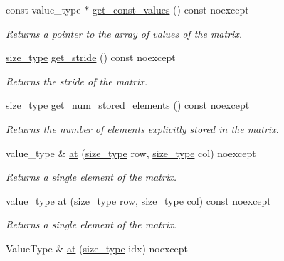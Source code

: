 \begin{DoxyCompactItemize}
const value\+\_\+type $\ast$ \hyperlink{classgko_1_1matrix_1_1Dense_ab83c739c1b11abaecc3bfd89506f6c9c}{get\+\_\+const\+\_\+values} () const noexcept
\begin{DoxyCompactList}\small\item\em Returns a pointer to the array of values of the matrix. \end{DoxyCompactList}\item 
\hyperlink{namespacegko_a6e5c95df0ae4e47aab2f604a22d98ee7}{size\+\_\+type} \hyperlink{classgko_1_1matrix_1_1Dense_a8c1b220b9b9292893d9be22d632a9a0e}{get\+\_\+stride} () const noexcept
\begin{DoxyCompactList}\small\item\em Returns the stride of the matrix. \end{DoxyCompactList}\item 
\hyperlink{namespacegko_a6e5c95df0ae4e47aab2f604a22d98ee7}{size\+\_\+type} \hyperlink{classgko_1_1matrix_1_1Dense_a7a6ce578c683841591718134e1ccd1b9}{get\+\_\+num\+\_\+stored\+\_\+elements} () const noexcept
\begin{DoxyCompactList}\small\item\em Returns the number of elements explicitly stored in the matrix. \end{DoxyCompactList}\item 
value\+\_\+type \& \hyperlink{classgko_1_1matrix_1_1Dense_af0f1af68853537807ca271a296de3cd0}{at} (\hyperlink{namespacegko_a6e5c95df0ae4e47aab2f604a22d98ee7}{size\+\_\+type} row, \hyperlink{namespacegko_a6e5c95df0ae4e47aab2f604a22d98ee7}{size\+\_\+type} col) noexcept
\begin{DoxyCompactList}\small\item\em Returns a single element of the matrix. \end{DoxyCompactList}\item 
value\+\_\+type \hyperlink{classgko_1_1matrix_1_1Dense_ae0b30c42359a03805dee41a5cbf87b26}{at} (\hyperlink{namespacegko_a6e5c95df0ae4e47aab2f604a22d98ee7}{size\+\_\+type} row, \hyperlink{namespacegko_a6e5c95df0ae4e47aab2f604a22d98ee7}{size\+\_\+type} col) const noexcept
\begin{DoxyCompactList}\small\item\em Returns a single element of the matrix. \end{DoxyCompactList}\item 
Value\+Type \& \hyperlink{classgko_1_1matrix_1_1Dense_ae6ce7585b533123b5572ddf502c9970f}{at} (\hyperlink{namespacegko_a6e5c95df0ae4e47aab2f604a22d98ee7}{size\+\_\+type} idx) noexcept

\end{DoxyCompactItemize}
